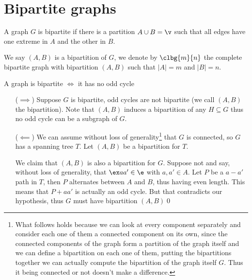 \chapter{Bipartite graphs}
\begin{definition}
    A graph $G$ is bipartite if there is a partition $A \cup B = \v$ such that all edges have one extreme in $A$ and the other in $B$.
\end{definition}
We say $(A, B)$ is a bipartition of $G$, we denote by $\clbg{m}{n}$ the complete bipartite graph with bipartition $(A, B)$ such that $|A| = m$ and $|B| = n$.
\begin{proposition}
    A graph is bipartite $\iff$ it has no odd cycle
\end{proposition}
\begin{prf}
    \begin{itemize}
        \item [($\implies$)] Suppose $G$ is bipartite, odd cycles are not bipartite (we call $(A, B)$ the bipartition). Note that $(A, B)$ induces a bipartition of any $H \subseteq G$ thus no odd cycle can be a subgraph of $G$.
        \item [($\impliedby$)] We can assume without loss of generality\footnote{What follows holds because we can look at every component separately and consider each one of them a connected component on its own, since the connected components of the graph form a partition of the graph itself and we can define a bipartition on each one of them, putting the bipartitions together we can actually compute the bipartition of the graph itself $G$. Thus it being connected or not doesn't make a difference.} that $G$ is connected, so $G$ has a spanning tree $T$. Let $(A, B)$ be a bipartition for $T$.
        
        We claim that $(A, B)$ is also a bipartition for $G$. Suppose not and say, without loss of generality, that $\ex aa' \in \e$ with $a, a' \in A$. Let $P$ be a $a - a'$ path in $T$, then $P$ alternates between $A$ and $B$, thus having even length. This means that $P + aa'$ is actually an odd cycle. But that contradicts our hypothesis, thus $G$ must have bipartition $(A, B)$\qed
    \end{itemize}
\end{prf}

